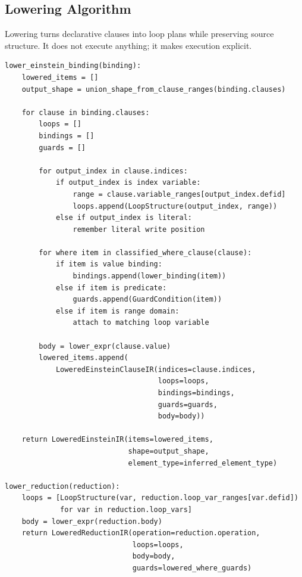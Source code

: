\subsection{Lowering Algorithm}

Lowering turns declarative clauses into loop plans while preserving source
structure. It does not execute anything; it makes execution explicit.

\begin{lstlisting}[style=pythoncode,caption={Lowering an Einstein binding.}]
lower_einstein_binding(binding):
    lowered_items = []
    output_shape = union_shape_from_clause_ranges(binding.clauses)

    for clause in binding.clauses:
        loops = []
        bindings = []
        guards = []

        for output_index in clause.indices:
            if output_index is index variable:
                range = clause.variable_ranges[output_index.defid]
                loops.append(LoopStructure(output_index, range))
            else if output_index is literal:
                remember literal write position

        for where item in classified_where_clause(clause):
            if item is value binding:
                bindings.append(lower_binding(item))
            else if item is predicate:
                guards.append(GuardCondition(item))
            else if item is range domain:
                attach to matching loop variable

        body = lower_expr(clause.value)
        lowered_items.append(
            LoweredEinsteinClauseIR(indices=clause.indices,
                                    loops=loops,
                                    bindings=bindings,
                                    guards=guards,
                                    body=body))

    return LoweredEinsteinIR(items=lowered_items,
                             shape=output_shape,
                             element_type=inferred_element_type)

lower_reduction(reduction):
    loops = [LoopStructure(var, reduction.loop_var_ranges[var.defid])
             for var in reduction.loop_vars]
    body = lower_expr(reduction.body)
    return LoweredReductionIR(operation=reduction.operation,
                              loops=loops,
                              body=body,
                              guards=lowered_where_guards)
\end{lstlisting}

